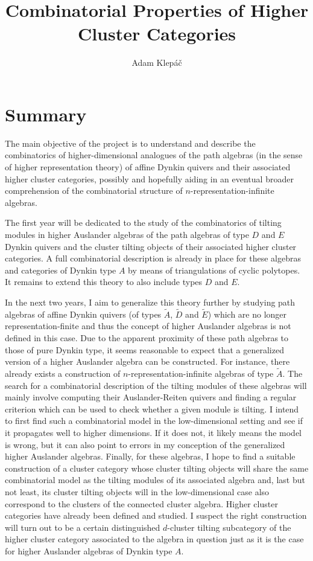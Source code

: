 \documentclass[a4paper,oneside,svgnames]{amsart}
\title{Combinatorial Properties of Higher Cluster Categories}
\author{Adam Klepáč}
\theoremstyle{plain}
\theoremstyle{definition}
\begin{document}
 \maketitle
 \section*{Summary}
 \setcounter{section}{1}

 The main objective of the project is to understand and describe the
 combinatorics of higher-dimension\-al analogues of the path algebras (in the
 sense of higher representation theory) of affine Dynkin quivers and their
 associated higher cluster categories, possibly and hopefully aiding in an
 eventual broader comprehension of the combinatorial structure of
 $n$-representation-infinite algebras.

 The first year will be dedicated to the study of the combinatorics of tilting
 modules in higher Auslander algebras of the path algebras of type $D$ and $E$
 Dynkin quivers and the cluster tilting objects of their associated higher 
 cluster categories. A full combinatorial description is already in place for
 these algebras and categories of Dynkin type $A$ by means of triangulations of
 cyclic polytopes. It remains to extend this theory to also include types $D$
 and $E$.

 In the next two years, I aim to generalize this theory further by studying path
 algebras of affine Dynkin quivers (of types $\tilde{A}$, $\tilde{D}$ and
 $\tilde{E}$) which are no longer representation-finite and thus the concept of
 higher Auslander algebras is not defined in this case. Due to the apparent
 proximity of these path algebras to those of pure Dynkin type, it seems
 reasonable to expect that a generalized version of a higher Auslander algebra
 can be constructed. For instance, there already exists a construction of
 $n$-representation-infinite algebras of type $\tilde{A}$. The search for a
 combinatorial description of the tilting modules of these algebras will mainly
 involve computing their Auslander-Reiten quivers and finding a regular
 criterion which can be used to check whether a given module is tilting. I
 intend to first find such a combinatorial model in the low-dimensional setting
 and see if it propagates well to higher dimensions. If it does not, it likely
 means the model is wrong, but it can also point to errors in my conception of
 the generalized higher Auslander algebras. Finally, for these algebras, I hope
 to find a suitable construction of a cluster category whose cluster tilting
 objects will share the same combinatorial model as the tilting modules of its
 associated algebra and, last but not least, its cluster tilting objects will in
 the low-dimensional case also correspond to the clusters of the connected
 cluster algebra. Higher cluster categories have already been defined and
 studied. I suspect the right construction will turn out to be a certain
 distinguished $d$-cluster tilting subcategory of the higher cluster category
 associated to the algebra in question just as it is the case for higher
 Auslander algebras of Dynkin type $A$.
\end{document}
